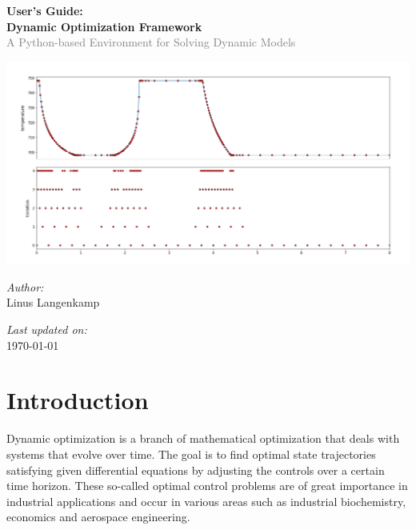 \documentclass[12pt]{article}
\date{\today}
\begin{document}
\begin{titlepage}
	\centering

	\vspace*{2.5cm}

	{\Huge\bfseries User's Guide:}\\[1em]

	{\Huge\bfseries Dynamic Optimization Framework}\\[0.5em]
	\textcolor{gray}{\large A Python-based Environment for Solving
		Dynamic Models}\\[1em]

	\vspace{2cm}

	\includegraphics[width=1\textwidth]{images/refinement.png}\par\vspace{1cm}
	\vspace{2cm}

	{\large \textit{Author:}}\\[0.5em]
	{\large Linus Langenkamp}

	\vfill
	{\large \textit{Last updated on:}}\\[0.5em]
	{\large \today}

	\vspace*{1cm}
\end{titlepage}

\newpage
\fancyhead[R]{}
\thispagestyle{fancy}
\tableofcontents
\newpage

\fancyhead[R]{\leftmark}  %

\clearpage
\pagestyle{fancy}
\setcounter{page}{1}  

\section{Introduction}

Dynamic optimization is a branch of mathematical optimization that deals with systems that evolve over time. The goal is to find optimal state trajectories satisfying given differential equations by adjusting the controls over a certain time horizon. These so-called optimal control problems are of great importance in industrial applications and occur in various areas
such as industrial biochemistry, economics and aerospace engineering.
\end{document}
